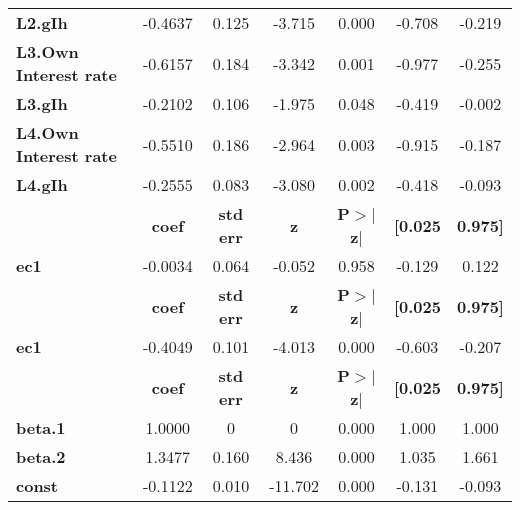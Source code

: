 \begin{center}
\begin{tabular}{lcccccc}
\textbf{L2.gIh}               &      -0.4637  &        0.125     &    -3.715  &         0.000        &       -0.708    &       -0.219     \\
\textbf{L3.Own Interest rate} &      -0.6157  &        0.184     &    -3.342  &         0.001        &       -0.977    &       -0.255     \\
\textbf{L3.gIh}               &      -0.2102  &        0.106     &    -1.975  &         0.048        &       -0.419    &       -0.002     \\
\textbf{L4.Own Interest rate} &      -0.5510  &        0.186     &    -2.964  &         0.003        &       -0.915    &       -0.187     \\
\textbf{L4.gIh}               &      -0.2555  &        0.083     &    -3.080  &         0.002        &       -0.418    &       -0.093     \\
             & \textbf{coef} & \textbf{std err} & \textbf{z} & \textbf{P$> |$z$|$} & \textbf{[0.025} & \textbf{0.975]}  \\
\midrule
\textbf{ec1} &      -0.0034  &        0.064     &    -0.052  &         0.958        &       -0.129    &        0.122     \\
             & \textbf{coef} & \textbf{std err} & \textbf{z} & \textbf{P$> |$z$|$} & \textbf{[0.025} & \textbf{0.975]}  \\
\midrule
\textbf{ec1} &      -0.4049  &        0.101     &    -4.013  &         0.000        &       -0.603    &       -0.207     \\
                & \textbf{coef} & \textbf{std err} & \textbf{z} & \textbf{P$> |$z$|$} & \textbf{[0.025} & \textbf{0.975]}  \\
\midrule
\textbf{beta.1} &       1.0000  &            0     &         0  &         0.000        &        1.000    &        1.000     \\
\textbf{beta.2} &       1.3477  &        0.160     &     8.436  &         0.000        &        1.035    &        1.661     \\
\textbf{const}  &      -0.1122  &        0.010     &   -11.702  &         0.000        &       -0.131    &       -0.093     \\
\bottomrule
\end{tabular}
\end{center}